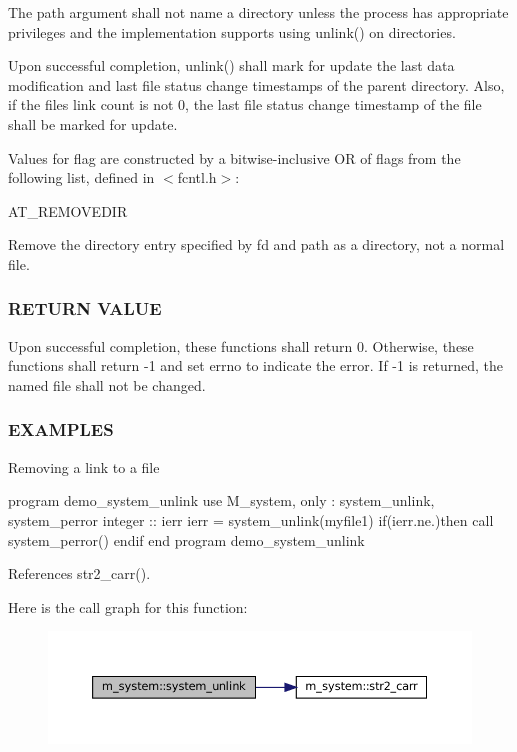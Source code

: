 The path argument shall not name a directory unless the process has appropriate privileges and the implementation supports using unlink() on directories.

Upon successful completion, unlink() shall mark for update the last data modification and last file status change timestamps of the parent directory. Also, if the file\textquotesingle{}s link count is not 0, the last file status change timestamp of the file shall be marked for update.

Values for flag are constructed by a bitwise-\/inclusive OR of flags from the following list, defined in $<$fcntl.\+h$>$\+:

A\+T\+\_\+\+R\+E\+M\+O\+V\+E\+D\+IR

Remove the directory entry specified by fd and path as a directory, not a normal file.

\subsubsection*{R\+E\+T\+U\+RN V\+A\+L\+UE}

\begin{DoxyVerb}Upon successful completion, these functions shall return 0. Otherwise,
these functions shall return -1 and set errno to indicate the error. If
-1 is returned, the named file shall not be changed.
\end{DoxyVerb}


\subsubsection*{E\+X\+A\+M\+P\+L\+ES}

Removing a link to a file

program demo\+\_\+system\+\_\+unlink use M\+\_\+system, only \+: system\+\_\+unlink, system\+\_\+perror integer \+:\+: ierr ierr = system\+\_\+unlink(\textquotesingle{}myfile1\textquotesingle{}) if(ierr.\+ne.)then call system\+\_\+perror(\textquotesingle{}) endif end program demo\+\_\+system\+\_\+unlink 

References str2\+\_\+carr().

Here is the call graph for this function\+:\nopagebreak
\begin{figure}[H]
\begin{center}
\leavevmode
\includegraphics[width=350pt]{namespacem__system_a3561c9beafec28439f760d701d55a6b8_cgraph}
\end{center}
\end{figure}
\mbox{\label{namespacem__system_a61b67b46b35490ec308773b65c3376a3}} 
